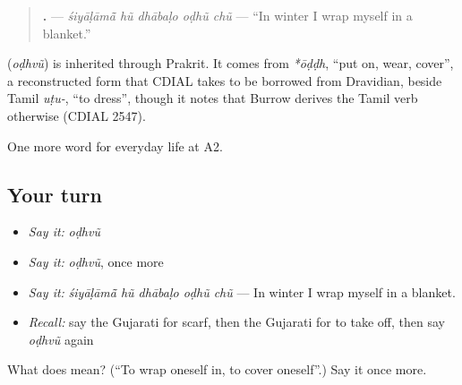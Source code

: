 \begin{quote}
\textbf{    .} — \emph{śiyāḷāmā̃ hũ dhābaḷo oḍhũ chũ} — \textquotedblleft{}In winter I wrap myself in a blanket.\textquotedblright{}
\end{quote}

\begin{cousinweb}
\textbf{} (\emph{oḍhvũ}) is inherited through Prakrit. It comes from \emph{*ōḍḍh}, \textquotedblleft{}put on, wear, cover\textquotedblright{}, a reconstructed form that CDIAL takes to be borrowed from Dravidian, beside Tamil \emph{uṭu-}, \textquotedblleft{}to dress\textquotedblright{}, though it notes that Burrow derives the Tamil verb otherwise (CDIAL 2547).
\end{cousinweb}

\begin{grammarlens}[title={What you've built}]
One more word for everyday life at A2.
\end{grammarlens}

\subsection*{Your turn}
\begin{itemize}
\raggedright
  \item \emph{Say it:} \emph{oḍhvũ}
  \item \emph{Say it:} \emph{oḍhvũ}, once more
  \item \emph{Say it:} \emph{śiyāḷāmā̃ hũ dhābaḷo oḍhũ chũ} — In winter I wrap myself in a blanket.
  \item \emph{Recall:} say the Gujarati for scarf, then the Gujarati for to take off, then say \emph{oḍhvũ} again
\end{itemize}

\begin{tcolorbox}[breakable,colback=teal!4,colframe=teal!35!black,title={Before you move on}]
What does  mean? (\textquotedblleft{}To wrap oneself in, to cover oneself\textquotedblright{}.) Say it once more.
\end{tcolorbox}
